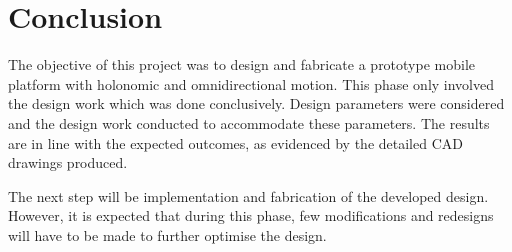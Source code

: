 \chapter{Conclusion}
The objective of this project was to design and fabricate a prototype mobile platform with holonomic and omnidirectional motion. This phase only involved the design work which was done conclusively. Design parameters were considered and the design work conducted to accommodate these parameters. The results are in line with the expected outcomes, as evidenced by the detailed CAD drawings produced.
\par
The next step will be implementation and fabrication of the developed design. However, it is expected that during this phase, few modifications and redesigns will have to be made to further optimise the design.